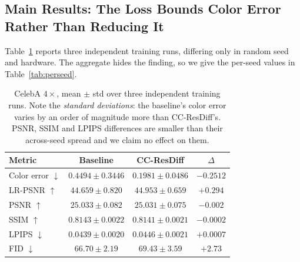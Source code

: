 \documentclass[11pt]{article}
\newcommand{\best}[1]{\textbf{#1}}
\begin{document}
\subsection{Main Results: The Loss Bounds Color Error Rather Than Reducing It}
\label{sec:main}

Table~\ref{tab:main} reports three independent training runs, differing only in
random seed and hardware. The aggregate hides the finding, so we give the
per-seed values in Table~\ref{tab:perseed}.

\begin{table}[t]
\centering
\small
\begin{tabular}{lccc}
\toprule
Metric & Baseline & CC-ResDiff & $\Delta$ \\
\midrule
Color error $\downarrow$ & $0.4494 \pm 0.3446$ & \best{$0.1981 \pm 0.0486$} & $-0.2512$ \\
LR-PSNR $\uparrow$       & $44.659 \pm 0.820$  & \best{$44.953 \pm 0.659$}  & $+0.294$ \\
PSNR $\uparrow$          & \best{$25.033 \pm 0.082$} & $25.031 \pm 0.075$ & $-0.002$ \\
SSIM $\uparrow$          & \best{$0.8143 \pm 0.0022$} & $0.8141 \pm 0.0021$ & $-0.0002$ \\
LPIPS $\downarrow$       & \best{$0.0439 \pm 0.0020$} & $0.0446 \pm 0.0021$ & $+0.0007$ \\
FID $\downarrow$         & \best{$66.70 \pm 2.19$} & $69.43 \pm 3.59$ & $+2.73$ \\
\bottomrule
\end{tabular}
\caption{CelebA $4\times$, mean $\pm$ std over three independent training runs.
Note the \emph{standard deviations}: the baseline's color error varies by an
order of magnitude more than CC-ResDiff's. PSNR, SSIM and LPIPS differences are
smaller than their across-seed spread and we claim no effect on them.}
\label{tab:main}
\end{table}
\end{document}
